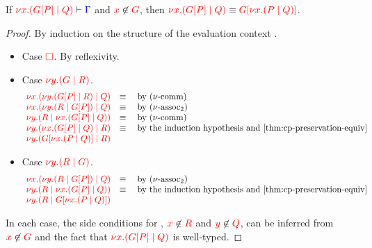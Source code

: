 \begin{lemmaB}\label{thm:cp-display-1}
  If $\seq[{ \tm{\cpCut{x}{\cpPlug{G}{P}}{Q}} }]{ \Gamma }$ and
  $\notFreeIn{x}{G}$, then $\tm{\cpCut{x}{\cpPlug{G}{P}}{Q}} \equiv
  \tm{\cpPlug{G}{\cpCut{x}{P}{Q}}}$. 
\end{lemmaB}
  \begin{proof}
    By induction on the structure of the evaluation context .
    \begin{itemize}
    \item
      Case $\tm{\Box}$. By reflexivity.
    \item
      Case $\tm{\cpCut{y}{G}{R}}$.
      \[\!
        \begin{array}{ll}
          \tm{\cpCut{x}{\cpCut{y}{\cpPlug{G}{P}}{R}}{Q}} & \equiv \quad \text{by \cpEquivCutComm}\\
          \tm{\cpCut{x}{\cpCut{y}{R}{\cpPlug{G}{P}}}{Q}} & \equiv \quad \text{by \cpEquivCutAss2}\\
          \tm{\cpCut{y}{R}{\cpCut{x}{\cpPlug{G}{P}}{Q}}} & \equiv \quad \text{by \cpEquivCutComm}\\
          \tm{\cpCut{y}{\cpCut{x}{\cpPlug{G}{P}}{Q}}{R}} & \equiv \quad \text{by the induction hypothesis and \cref{thm:cp-preservation-equiv}}\\ 
          \tm{\cpCut{y}{\cpPlug{G}{\cpCut{x}{P}{Q}}}{R}} &
        \end{array}
      \]
    \item
      Case $\tm{\cpCut{y}{R}{G}}$.
      \[\!
        \begin{array}{ll}
          \tm{\cpCut{x}{\cpCut{y}{R}{\cpPlug{G}{P}}}{Q}} & \equiv \quad \text{by \cpEquivCutAss2}\\
          \tm{\cpCut{y}{R}{\cpCut{x}{\cpPlug{G}{P}}{Q}}} & \equiv \quad \text{by the induction hypothesis and \cref{thm:cp-preservation-equiv}}\\
          \tm{\cpCut{y}{R}{\cpPlug{G}{\cpCut{x}{P}{Q}}}}
        \end{array}
      \]
    \end{itemize}
    In each case, the side conditions for , $\notFreeIn{x}{R}$ and
    $\notFreeIn{y}{Q}$, can be inferred from $\notFreeIn{x}{G}$ and the fact that
    $\tm{\cpCut{x}{\cpPlug{G}{P}}{Q}}$ is well-typed.
  \end{proof}
